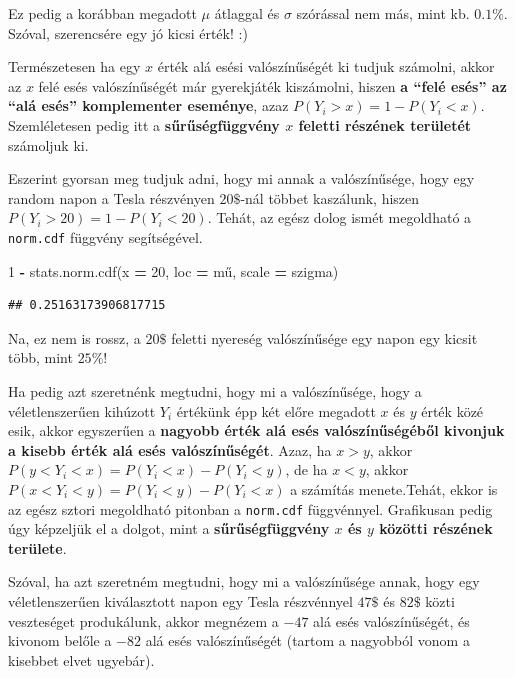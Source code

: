 \documentclass[
]{book}
\newenvironment{Shaded}{\begin{snugshade}}{\end{snugshade}}
\newcommand{\DecValTok}[1]{\textcolor[rgb]{0.00,0.00,0.81}{#1}}
\newcommand{\NormalTok}[1]{#1}
\newcommand{\OperatorTok}[1]{\textcolor[rgb]{0.81,0.36,0.00}{\textbf{#1}}}
\begin{document}
Ez pedig a korábban megadott \(\mu\) átlaggal és \(\sigma\) szórással nem más, mint kb. \(0.1\%\). Szóval, szerencsére egy jó kicsi érték! :)

Természetesen ha egy \(x\) érték alá esési valószínűségét ki tudjuk számolni, akkor az \(x\) felé esés valószínűségét már gyerekjáték kiszámolni, hiszen \textbf{a ``felé esés'' az ``alá esés'' komplementer eseménye}, azaz \(P(Y_i>x)=1-P(Y_i<x)\). Szemléletesen pedig itt a \textbf{sűrűségfüggvény \(x\) feletti részének területét} számoljuk ki.

Eszerint gyorsan meg tudjuk adni, hogy mi annak a valószínűsége, hogy egy random napon a Tesla részvényen \(20\$\)-nál többet kaszálunk, hiszen \(P(Y_i>20)=1-P(Y_i<20)\). Tehát, az egész dolog ismét megoldható a \texttt{norm.cdf} függvény segítségével.

\begin{Shaded}
\begin{Highlighting}[]
\DecValTok{1} \OperatorTok{{-}}\NormalTok{ stats.norm.cdf(x }\OperatorTok{=} \DecValTok{20}\NormalTok{, loc }\OperatorTok{=}\NormalTok{ mű, scale }\OperatorTok{=}\NormalTok{ szigma)}
\end{Highlighting}
\end{Shaded}

\begin{verbatim}
## 0.25163173906817715
\end{verbatim}

Na, ez nem is rossz, a \(20\$\) feletti nyereség valószínűsége egy napon egy kicsit több, mint \(25\%\)!

Ha pedig azt szeretnénk megtudni, hogy mi a valószínűsége, hogy a véletlenszerűen kihúzott \(Y_i\) értékünk épp két előre megadott \(x\) és \(y\) érték közé esik, akkor egyszerűen a \textbf{nagyobb érték alá esés valószínűségéből kivonjuk a kisebb érték alá esés valószínűségét}. Azaz, ha \(x>y\), akkor \(P(y<Y_i<x)=P(Y_i<x)-P(Y_i<y)\), de ha \(x<y\), akkor \(P(x<Y_i<y)=P(Y_i<y)-P(Y_i<x)\) a számítás menete.Tehát, ekkor is az egész sztori megoldható pitonban a \texttt{norm.cdf} függvénnyel. Grafikusan pedig úgy képzeljük el a dolgot, mint a \textbf{sűrűségfüggvény \(x\) és \(y\) közötti részének területe}.

Szóval, ha azt szeretném megtudni, hogy mi a valószínűsége annak, hogy egy véletlenszerűen kiválasztott napon egy Tesla részvénnyel \(47\$\) és \(82\$\) közti veszteséget produkálunk, akkor megnézem a \(-47\) alá esés valószínűségét, és kivonom belőle a \(-82\) alá esés valószínűségét (tartom a nagyobból vonom a kisebbet elvet ugyebár).
\end{document}

